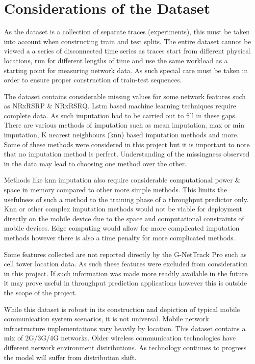 \newpage
\section{Considerations of the Dataset}

As the dataset is a collection of separate traces (experiments), this must be taken into account when constructing train and test splits. The entire dataset cannot be viewed a a series of disconnected time series as traces start from different physical locations, run for different lengths of time and use the same workload as a starting point for measuring network data. As such special care must be taken in order to ensure proper construction of train-test sequences.

The dataset contains considerable missing values for some network features such as NRxRSRP \& NRxRSRQ. Lstm based machine learning techniques require complete data. As such imputation had to be carried out to fill in these gaps. There are various methods of imputation such as mean imputation, max or min imputation, K nearest neighbours (knn) based imputation methods and more. Some of these methods were considered in this project but it is important to note that no imputation method is perfect. Understanding of the missingness observed in the data may lead to choosing one method over the other. 

Methods like knn imputation also require considerable computational power \& space in memory compared to other more simple methods. This limits the usefulness of such a method to the training phase of a throughput predictor only. Knn or other complex imputation methods would not be viable for deployment directly on the mobile device due to the space and computational constraints of mobile devices. Edge computing would allow for more complicated imputation methods however there is also a time penalty for more complicated methods.

Some features collected are not reported directly by the G-NetTrack Pro such as cell tower location data. As such these features were excluded from consideration in this project. If such information was made more readily available in the future it may prove useful in throughput prediction applications however this is outside the scope of the project.

While this dataset is robust in its construction and depiction of typical mobile communication system scenarios, it is not universal. Mobile network infrastructure implementations vary heavily by location. This dataset contains a mix of 2G/3G/4G networks. Older wireless communication technologies have different network environment distributions. As technology continues to progress the model will suffer from distribution shift.

